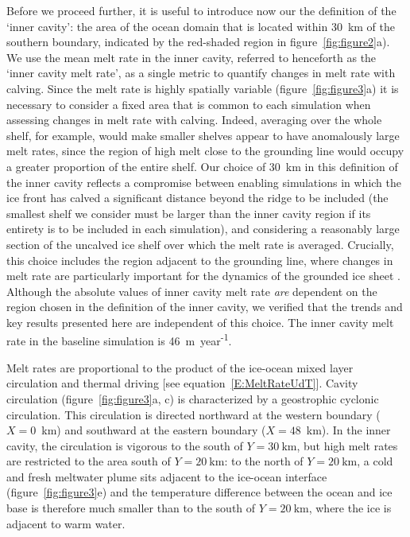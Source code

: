 \documentclass[draft]{agujournal2019}
\begin{document}
Before we proceed further, it is useful to introduce now our the definition of the `inner cavity': the area of the ocean domain that is located within 30~km of the southern boundary, indicated by the red-shaded region in figure~\ref{fig:figure2}a). We use the mean melt rate in the inner cavity, referred to henceforth as the `inner cavity melt rate', as a single metric to quantify changes in melt rate with calving. Since the melt rate is highly spatially variable (figure~\ref{fig:figure3}a) it is necessary to consider a fixed area that is common to each simulation when assessing changes in melt rate with calving. Indeed, averaging over the whole shelf, for example, would make smaller shelves appear to have anomalously large melt rates, since the region of high melt close to the grounding line would occupy a greater proportion of the entire shelf. Our choice of 30~km in this definition of the inner cavity reflects a compromise between enabling simulations in which the ice front has calved a significant distance beyond the ridge to be included (the smallest shelf we consider must be larger than the inner cavity region if its entirety is to be included in each simulation), and considering a reasonably large section of the uncalved ice shelf over which the melt rate is averaged. Crucially, this choice includes the region adjacent to the grounding line, where changes in melt rate are particularly important for the dynamics of the grounded ice sheet \cite{Seroussi2014Cryo, Athern2017GRL}. Although the absolute values of inner cavity melt rate \textit{are} dependent on the region chosen in the definition of the inner cavity, we verified that the trends and key results presented here are independent of this choice. The inner cavity melt rate in the baseline simulation is 46~m~year\textsuperscript{-1}.

Melt rates are proportional to the product of the ice-ocean mixed layer circulation and thermal driving [see equation~\eqref{E:MeltRateUdT}]. Cavity circulation (figure~\ref{fig:figure3}a, c) is characterized by a geostrophic cyclonic circulation. This circulation is directed northward at the western boundary ($X=0$~km) and southward at the eastern boundary ($X=48$~km). In the inner cavity, the circulation is vigorous to the south of $Y=30~\text{km}$, but high melt rates are restricted to the area south of $Y=20~\text{km}$: to the north of $Y=20~\text{km}$, a cold and fresh meltwater plume sits adjacent to the ice-ocean interface (figure~\ref{fig:figure3}e) and the temperature difference between the ocean and ice base is therefore much smaller than to the south of $Y=20~\text{km}$, where the ice is adjacent to warm water.
\end{document}
